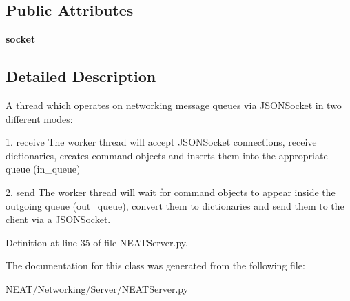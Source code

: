 \subsection*{Public Attributes}
\begin{DoxyCompactItemize}
\item 
{\bfseries socket}\hypertarget{class_n_e_a_t___py_genetics_1_1_n_e_a_t_1_1_networking_1_1_server_1_1_n_e_a_t_server_1_1_queue_worker_ad5eb20f5b3bfb6a6aafa945bd5103c1b}{}\label{class_n_e_a_t___py_genetics_1_1_n_e_a_t_1_1_networking_1_1_server_1_1_n_e_a_t_server_1_1_queue_worker_ad5eb20f5b3bfb6a6aafa945bd5103c1b}

\end{DoxyCompactItemize}


\subsection{Detailed Description}
\begin{DoxyVerb}A thread which operates on networking message queues
via JSONSocket in two different modes:

1. receive
The worker thread will accept JSONSocket connections,
receive dictionaries, creates command objects and inserts them
into the appropriate queue (in_queue)

2. send
The worker thread will wait for command objects to appear inside
the outgoing queue (out_queue), convert them to dictionaries
and send them to the client via a JSONSocket.
\end{DoxyVerb}
 

Definition at line 35 of file N\+E\+A\+T\+Server.\+py.



The documentation for this class was generated from the following file\+:\begin{DoxyCompactItemize}
\item 
N\+E\+A\+T/\+Networking/\+Server/N\+E\+A\+T\+Server.\+py\end{DoxyCompactItemize}
